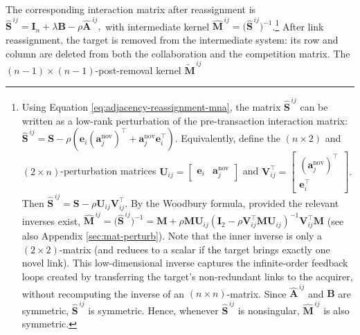 The corresponding interaction matrix after reassignment is
$
\widehat{\mathbf{S}}^{\,ij}
=
\mathbf{I}_n+\lambda\mathbf{B}
-
\rho\widehat{\mathbf{A}}^{\,ij},
$
with intermediate kernel
$
\widehat{\mathbf{M}}^{\,ij}
=
\big(\widehat{\mathbf{S}}^{\,ij}\big)^{-1}$.\footnote{Using Equation \eqref{eq:adjacency-reassignment-mna}, the matrix
$\widehat{\mathbf{S}}^{\,ij}$ can be written as a low-rank perturbation of the
pre-transaction interaction matrix:
$
\widehat{\mathbf{S}}^{\,ij}
=
\mathbf{S}
-
\rho
\left(
\mathbf{e}_i\left(\mathbf{a}_{j}^{\text{nov}}\right)^{\top}
+
\mathbf{a}_{j}^{\text{nov}}\mathbf{e}_i^{\top}
\right).
$
Equivalently, define the $(n\times 2)$ and $(2\times n)$-perturbation matrices
$
\mathbf{U}_{ij}
=
\begin{bmatrix}
\mathbf{e}_i
&
\mathbf{a}_{j}^{\text{nov}}
\end{bmatrix}$ and
$
\mathbf{V}_{ij}^{\top}
=
\begin{bmatrix}
\left(\mathbf{a}_{j}^{\text{nov}}\right)^{\top}
\\
\mathbf{e}_i^{\top}
\end{bmatrix}.
$
Then
$
\widehat{\mathbf{S}}^{\,ij}
=
\mathbf{S}
-
\rho\mathbf{U}_{ij}\mathbf{V}_{ij}^{\top}.
$
By the Woodbury formula, provided the relevant inverses exist,
$
\widehat{\mathbf{M}}^{\,ij}
=
\big(\widehat{\mathbf{S}}^{\,ij}\big)^{-1}
=
\mathbf{M}
+
\rho
\mathbf{M}\mathbf{U}_{ij}
\left(
\mathbf{I}_2
-
\rho\mathbf{V}_{ij}^{\top}\mathbf{M}\mathbf{U}_{ij}
\right)^{-1}
\mathbf{V}_{ij}^{\top}\mathbf{M}
$
(see also Appendix \ref{sec:mat-perturb}).
Note that the inner inverse is only a $(2\times 2)$-matrix (and reduces to a scalar if the target brings exactly one novel link). This low-dimensional inverse captures the infinite-order feedback loops created by transferring the target's non-redundant links to the acquirer, without recomputing the inverse of an $(n\times n)$-matrix. Since $\widehat{\mathbf{A}}^{\,ij}$ and $\mathbf{B}$ are symmetric, $\widehat{\mathbf{S}}^{\,ij}$ is symmetric. Hence, whenever $\widehat{\mathbf{S}}^{\,ij}$ is nonsingular, $\widehat{\mathbf{M}}^{\,ij}$ is also symmetric.} %
After link reassignment, the target is removed from the intermediate system: its row and column are deleted from both the collaboration and the competition matrix.
The $(n-1) \times (n-1)$-post-removal kernel $\widetilde{\mathbf{M}}^{\,ij}$
